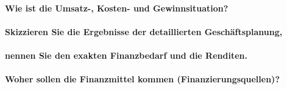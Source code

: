 \documentclass{article}
\begin{document}
\paragraph{Wie ist die Umsatz-, Kosten- und Gewinnsituation?}

\paragraph{Skizzieren Sie die Ergebnisse der detaillierten Geschäftsplanung,}

\paragraph{nennen Sie den exakten Finanzbedarf und die Renditen.}

\paragraph{Woher sollen die Finanzmittel kommen (Finanzierungsquellen)?}
\end{document}

